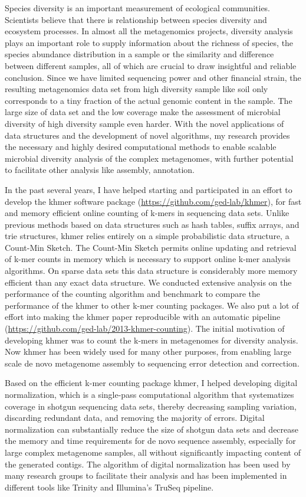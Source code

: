 \documentclass[12pt]{article}
\theoremstyle{plain} \numberwithin{equation}{section}
\theoremstyle{definition}
\newcounter{list}
\begin{document}
 Species diversity is an important measurement of ecological communities. Scientists 
believe that there is relationship between species diversity and ecosystem processes.
 In almost all the metagenomics projects, diversity analysis plays an important role to supply information 
 about the richness of species, the species abundance
distribution in a sample or the similarity and difference between different 
samples, all of which are crucial to draw insightful and reliable conclusion. Since we have limited
 sequencing power and other financial strain, the resulting metagenomics data set from 
 high diversity sample like soil only corresponds to a tiny fraction of the actual genomic
 content in the sample. The large size of data set and the low coverage make the assessment of microbial 
 diversity of high diversity sample even harder. With the novel applications of data structures and the development 
 of novel algorithms, my research provides the necessary and highly desired computational methods to enable 
 scalable microbial diversity analysis of the complex metagenomes, with further potential to facilitate other analysis like assembly, annotation.


 In the past several years, I have helped starting and participated in an effort to develop the khmer software package 
 (\url{https://github.com/ged-lab/khmer}), for fast and memory efficient online counting of k-mers in sequencing data sets. 
 Unlike previous methods based on data structures such as hash tables, suffix arrays, and trie structures, khmer relies 
 entirely on a simple probabilistic data structure, a Count-Min Sketch. The Count-Min Sketch permits online updating and retrieval of k-mer counts in memory which is necessary to support online k-mer analysis algorithms. On sparse data sets this data structure is considerably more 
 memory efficient than any exact data structure.
 We conducted extensive  analysis on the performance of the counting algorithm and benchmark to compare the 
 performance of the khmer to other k-mer counting packages. 
  We also put a lot of effort into making the khmer paper reproducible with an automatic pipeline
   (\url{https://github.com/ged-lab/2013-khmer-counting}). The initial motivation of developing khmer was to count the 
   k-mers in metagenomes for diversity analysis. Now khmer has been widely used for many other purposes, from  
   enabling large scale de novo metagenome assembly  to sequencing error detection and correction.
  
 Based on the efficient k-mer counting package khmer, I helped developing digital normalization, which is a single-pass 
 computational algorithm that systematizes coverage in shotgun sequencing data sets, thereby decreasing sampling 
 variation, discarding redundant data, and removing the majority of errors. Digital normalization can substantially reduce 
 the size of shotgun data sets and decrease the memory and time requirements for de novo sequence assembly, 
 especially for large complex metagenome samples, all without significantly impacting content of the generated contigs. 
 The algorithm of digital normalization has been used by many research groups to facilitate their analysis and has been 
 implemented in different tools like Trinity and  Illumina's TruSeq pipeline.
\end{document}
